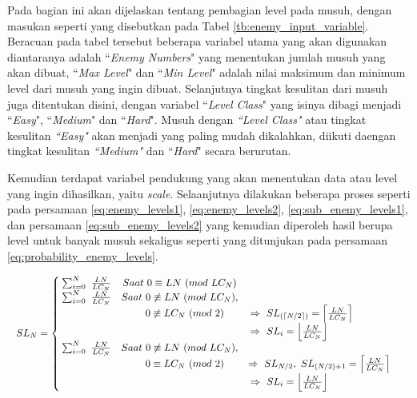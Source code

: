 Pada bagian ini akan dijelaskan tentang pembagian level pada musuh, dengan masukan seperti yang disebutkan pada Tabel \ref{tb:enemy_input_variable}. Beracuan pada tabel tersebut beberapa variabel utama yang akan digunakan diantaranya adalah ``\textit{Enemy Numbers}" yang menentukan jumlah musuh yang akan dibuat, ``\textit{Max Level}" dan ``\textit{Min Level}" adalah nilai maksimum dan minimum level dari musuh yang ingin dibuat. Selanjutnya tingkat kesulitan dari musuh juga ditentukan disini, dengan variabel ``\textit{Level Class}" yang isinya dibagi menjadi ``\textit{Easy}", ``\textit{Medium}" dan ``\textit{Hard}". Musuh dengan \textit{``Level Class"} atau tingkat kesulitan \textit{``Easy"} akan menjadi yang paling mudah dikalahkan, diikuti daengan tingkat kesulitan \textit{``Medium"} dan ``\textit{Hard}" secara berurutan.
\vspace{1ex}

Kemudian terdapat variabel pendukung yang akan menentukan data atau level yang ingin dihasilkan, yaitu \textit{scale}. Selaanjutnya dilakukan beberapa proses seperti pada persamaan \ref{eq:enemy_levels1}, \ref{eq:enemy_levels2}, \ref{eq:sub_enemy_levels1}, dan persamaan \ref{eq:sub_enemy_levels2} yang kemudian diperoleh hasil berupa level untuk banyak musuh sekaligus seperti yang ditunjukan pada persamaan \ref{eq:probability_enemy_levels}.
\vspace{1ex}

\begin{equation}\label{eq:enemy_levels1}
	\resizebox{\columnwidth}{!}{%
		$SL_{N} = \left\{\begin{matrix}
		\hspace{0.2em} \sum_{i = 0}^{N}\ \frac{LN}{LC_{N}} & Saat\ 0 \equiv LN\ (mod\ LC_{N}) & \\
		
		\hspace{0.2em} \sum_{i = 0}^{N}\ \frac{LN}{LC_{N}} & Saat\ 0 \not\equiv LN\ (mod\ LC_{N}), & \\
		&\hspace{1.0em}  0 \not\equiv LC_{N}\ (mod\ 2) & \hspace{-3.5em} \Rightarrow\ SL_{(\left \lceil N/2 \right \rceil)}  = \left \lceil \frac{LN}{LC_{N}} \right \rceil &\\
		
		& & \hspace{-6.0em} \Rightarrow\ SL_{i}  = \left \lfloor \frac{LN}{LC_{N}} \right \rfloor &\\
		
		\hspace{0.2em} \sum_{i = 0}^{N}\ \frac{LN}{LC_{N}} & Saat\ 0 \not\equiv LN\ (mod\ LC_{N}), & \\
		&\hspace{1.0em}  0 \equiv LC_{N}\ (mod\ 2) & \Rightarrow\ SL_{N/2},\ SL_{(N/2) + 1}  = \left \lceil \frac{LN}{LC_{N}} \right \rceil &\\
		
		& & \hspace{-6.0em} \Rightarrow\ SL_{i}  = \left \lfloor \frac{LN}{LC_{N}} \right \rfloor &\\
		\end{matrix}\right.$%
	}
\end{equation}

